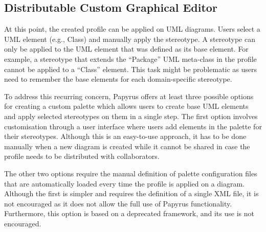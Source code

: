 \subsection{Distributable Custom Graphical Editor}

At this point, the created profile can be applied on UML 
diagrams. Users select a UML element (e.g., Class) and manually apply the stereotype. A stereotype can only be applied to the UML element that was defined as its 
base element. For example, a stereotype that 
extends the ``Package'' UML meta-class in the profile cannot be applied to a 
``Class'' element. This task might be problematic as users need to remember the 
base elements for each domain-specific stereotype. 


To address this recurring concern, Papyrus offers at least three possible 
options for creating a custom palette which allows users to create base UML 
elements and apply selected stereotypes on them in a single step. The first 
option involves customisation through a user interface where users add elements 
in the palette for their stereotypes. Although this is an 
easy-to-use approach, it has to be done manually when a new diagram is created 
while it cannot be shared in case the profile needs to be distributed with 
collaborators. 

The other two options require the manual definition of palette configuration 
files that are automatically loaded every time the profile is applied on a 
diagram. Although the first is simpler and requires the definition of a single 
XML file, it is not encouraged as it does not allow the full use of Papyrus 
functionality. Furthermore, this option is based on a deprecated framework, and 
its use is not encouraged.

